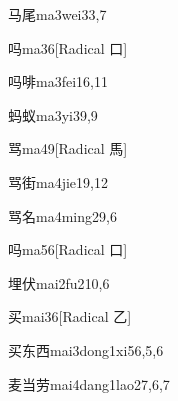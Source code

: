 \begin{verbete}{马尾}{ma3wei3}{3,7}
\end{verbete}

\begin{verbete}{吗}{ma3}{6}[Radical 口]
\end{verbete}

\begin{verbete*}{吗啡}{ma3fei1}{6,11}
\end{verbete*}

\begin{verbete}{蚂蚁}{ma3yi3}{9,9}
\end{verbete}

\begin{verbete}{骂}{ma4}{9}[Radical 馬]
\end{verbete}

\begin{verbete}{骂街}{ma4jie1}{9,12}
\end{verbete}

\begin{verbete}{骂名}{ma4ming2}{9,6}
\end{verbete}

\begin{verbete}{吗}{ma5}{6}[Radical 口]
\end{verbete}

\begin{verbete}{埋伏}{mai2fu2}{10,6}
\end{verbete}

\begin{verbete}{买}{mai3}{6}[Radical 乙]
\end{verbete}

\begin{verbete}{买东西}{mai3dong1xi5}{6,5,6}
\end{verbete}

\begin{verbete}{麦当劳}{mai4dang1lao2}{7,6,7}
\end{verbete}


